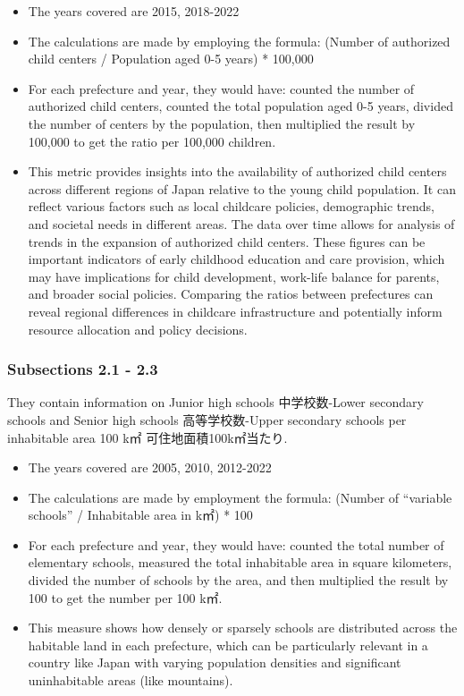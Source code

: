 \documentclass[
  12pt,
  letterpaper,
  DIV=11,
  numbers=noendperiod]{scrartcl}
\begin{document}
\begin{itemize}
\item
  The years covered are 2015, 2018-2022
\item
  The calculations are made by employing the formula: (Number of
  authorized child centers / Population aged 0-5 years) * 100,000
\item
  For each prefecture and year, they would have: counted the number of
  authorized child centers, counted the total population aged 0-5 years,
  divided the number of centers by the population, then multiplied the
  result by 100,000 to get the ratio per 100,000 children.
\item
  This metric provides insights into the availability of authorized
  child centers across different regions of Japan relative to the young
  child population. It can reflect various factors such as local
  childcare policies, demographic trends, and societal needs in
  different areas. The data over time allows for analysis of trends in
  the expansion of authorized child centers. These figures can be
  important indicators of early childhood education and care provision,
  which may have implications for child development, work-life balance
  for parents, and broader social policies. Comparing the ratios between
  prefectures can reveal regional differences in childcare
  infrastructure and potentially inform resource allocation and policy
  decisions.
\end{itemize}

\hypertarget{subsections-2.1---2.3}{%
\subsubsection{Subsections 2.1 - 2.3}\label{subsections-2.1---2.3}}

They contain information on Junior high schools 中学校数-Lower secondary
schools and Senior high schools 高等学校数-Upper secondary schools per
inhabitable area 100 k㎡ 可住地面積100k㎡当たり.

\begin{itemize}
\item
  The years covered are 2005, 2010, 2012-2022
\item
  The calculations are made by employment the formula: (Number of
  ``variable schools'' / Inhabitable area in k㎡) * 100
\item
  For each prefecture and year, they would have: counted the total
  number of elementary schools, measured the total inhabitable area in
  square kilometers, divided the number of schools by the area, and then
  multiplied the result by 100 to get the number per 100 k㎡.
\item
  This measure shows how densely or sparsely schools are distributed
  across the habitable land in each prefecture, which can be
  particularly relevant in a country like Japan with varying population
  densities and significant uninhabitable areas (like mountains).
\end{itemize}
\end{document}

